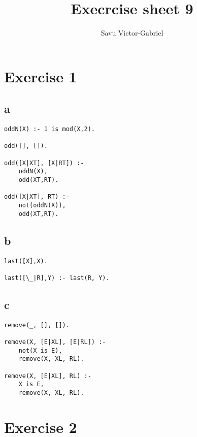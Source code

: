 \documentclass[10pt,a4paper]{article}
\title{Execrcise sheet 9}
\author{Savu Victor-Gabriel}
\begin{document}
	\maketitle
	
\section{Exercise 1}
	
\subsection{a}
	
	\begin{lstlisting}
oddN(X) :- 1 is mod(X,2).

odd([], []).

odd([X|XT], [X|RT]) :-
	oddN(X),
	odd(XT,RT).

odd([X|XT], RT) :-
	not(oddN(X)),
	odd(XT,RT).
	\end{lstlisting}

\subsection{b}

	\begin{lstlisting}
last([X],X).

last([\_|R],Y) :- last(R, Y).
	\end{lstlisting}

\subsection{c}

	\begin{lstlisting}
remove(_, [], []).

remove(X, [E|XL], [E|RL]) :-
	not(X is E),
	remove(X, XL, RL).

remove(X, [E|XL], RL) :-
	X is E,
	remove(X, XL, RL).
	\end{lstlisting}
	
\section{Exercise 2}
\end{document}
